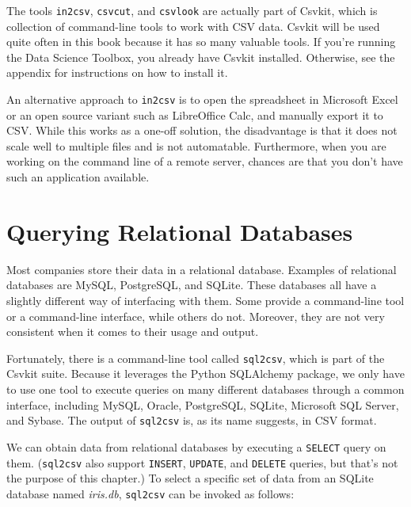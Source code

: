 \documentclass[
]{book}
\theoremstyle{definition}
\theoremstyle{definition}
\theoremstyle{definition}
\theoremstyle{remark}
\begin{document}
The tools \texttt{in2csv}, \texttt{csvcut}, and \texttt{csvlook} are actually part of Csvkit, which is collection of command-line tools to work with CSV data. Csvkit will be used quite often in this book because it has so many valuable tools. If you're running the Data Science Toolbox, you already have Csvkit installed. Otherwise, see the appendix for instructions on how to install it.

\begin{rmdnote}
An alternative approach to \texttt{in2csv} is to open the spreadsheet in Microsoft Excel or an open source variant such as LibreOffice Calc, and manually export it to CSV. While this works as a one-off solution, the disadvantage is that it does not scale well to multiple files and is not automatable. Furthermore, when you are working on the command line of a remote server, chances are that you don't have such an application available.
\end{rmdnote}

\hypertarget{querying-relational-databases}{%
\section{Querying Relational Databases}\label{querying-relational-databases}}

Most companies store their data in a relational database. Examples of relational databases are MySQL, PostgreSQL, and SQLite. These databases all have a slightly different way of interfacing with them. Some provide a command-line tool or a command-line interface, while others do not. Moreover, they are not very consistent when it comes to their usage and output.

Fortunately, there is a command-line tool called \texttt{sql2csv}, which is part of the Csvkit suite. Because it leverages the Python SQLAlchemy package, we only have to use one tool to execute queries on many different databases through a common interface, including MySQL, Oracle, PostgreSQL, SQLite, Microsoft SQL Server, and Sybase. The output of \texttt{sql2csv} is, as its name suggests, in CSV format.

We can obtain data from relational databases by executing a \texttt{SELECT} query on them. (\texttt{sql2csv} also support \texttt{INSERT}, \texttt{UPDATE}, and \texttt{DELETE} queries, but that's not the purpose of this chapter.) To select a specific set of data from an SQLite database named \emph{iris.db}, \texttt{sql2csv} can be invoked as follows:
\end{document}
